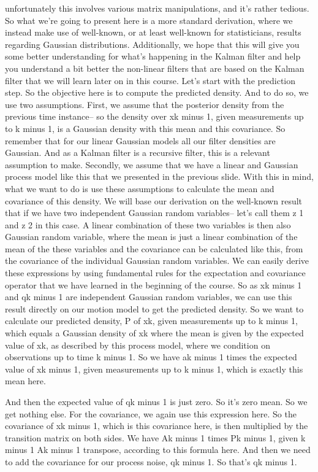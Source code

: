unfortunately this involves various matrix manipulations,
and it's rather tedious.
So what we're going to present here
is a more standard derivation, where we instead
make use of well-known, or at least
well-known for statisticians, results regarding
Gaussian distributions.
Additionally, we hope that this will give you
some better understanding for what's happening in the Kalman
filter and help you understand a bit better
the non-linear filters that are based on the Kalman filter
that we will learn later on in this course.
Let's start with the prediction step.
So the objective here is to compute the predicted density.
And to do so, we use two assumptions.
First, we assume that the posterior density
from the previous time instance-- so the density
over xk minus 1, given measurements up to k minus 1,
is a Gaussian density with this mean and this covariance.
So remember that for our linear Gaussian models
all our filter densities are Gaussian.
And as a Kalman filter is a recursive filter,
this is a relevant assumption to make.
Secondly, we assume that we have a linear and Gaussian process
model like this that we presented
in the previous slide.
With this in mind, what we want to do
is use these assumptions to calculate the mean
and covariance of this density.
We will base our derivation on the well-known result
that if we have two independent Gaussian random variables--
let's call them z 1 and z 2 in this case.
A linear combination of these two variables
is then also Gaussian random variable, where
the mean is just a linear combination
of the mean of the these variables and the covariance
can be calculated like this, from the covariance
of the individual Gaussian random variables.
We can easily derive these expressions
by using fundamental rules for the expectation and covariance
operator that we have learned in the beginning of the course.
So as xk minus 1 and qk minus 1 are
independent Gaussian random variables,
we can use this result directly on our motion model
to get the predicted density.
So we want to calculate our predicted density, P of xk,
given measurements up to k minus 1,
which equals a Gaussian density of xk where the mean is given
by the expected value of xk, as described by this process
model, where we condition on observations up
to time k minus 1.
So we have ak minus 1 times the expected value
of xk minus 1, given measurements up to k minus 1,
which is exactly this mean here.

And then the expected value of qk minus 1 is just zero.
So it's zero mean.
So we get nothing else.
For the covariance, we again use this expression here.
So the covariance of xk minus 1, which is this covariance here,
is then multiplied by the transition
matrix on both sides.
We have Ak minus 1 times Pk minus 1, given k
minus 1 Ak minus 1 transpose, according to this formula here.
And then we need to add the covariance for our process
noise, qk minus 1.
So that's qk minus 1.

